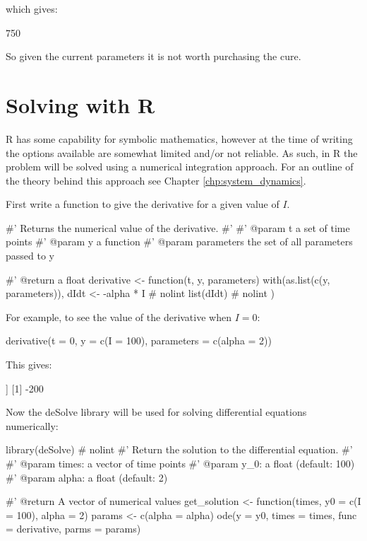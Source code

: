 which gives:

\begin{pyout}
750
\end{pyout}

So given the current parameters it is not worth purchasing the cure.

\section{Solving with R}\label{sec:solving-with-R}

R has some capability for symbolic mathematics, however at the time of writing
the options available are somewhat limited and/or not reliable. As such, in R
the problem will be solved using a numerical integration approach. For an
outline of the theory behind this approach see Chapter
\ref{chp:system_dynamics}.

First write a function to give the derivative for a given value of \(I\).

\begin{Rin}
#' Returns the numerical value of the derivative.
#'
#' @param t a set of time points
#' @param y a function
#' @param parameters the set of all parameters passed to y

#' @return a float
derivative <- function(t, y, parameters) {
  with(as.list(c(y, parameters)), {
    dIdt <- -alpha * I  # nolint
    list(dIdt)  # nolint
  })
}
\end{Rin}

For example, to see the value of the derivative when \(I=0\):

\begin{Rin}
derivative(t = 0, y = c(I = 100), parameters = c(alpha = 2))
\end{Rin}

This gives:

\begin{Rout}
[[1]]
[1] -200

\end{Rout}

Now the deSolve library will be used for solving differential equations
numerically:

\begin{Rin}
library(deSolve)  # nolint
#' Return the solution to the differential equation.
#'
#' @param times: a vector of time points
#' @param y_0: a float (default: 100)
#' @param alpha: a float (default: 2)

#' @return A vector of numerical values
get_solution <- function(times,
                          y0 = c(I = 100),
                          alpha = 2) {
  params <- c(alpha = alpha)
  ode(y = y0, times = times, func = derivative, parms = params)
}
\end{Rin}

